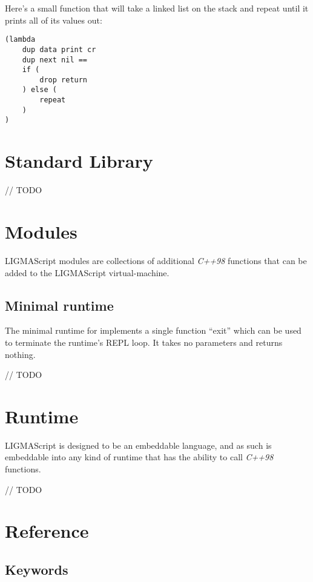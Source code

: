 \documentclass[12pt]{article}
\begin{document}
Here's a small function that will take a linked list on the stack and repeat until it prints all of its 
values out:
\begin{Verbatim}
(lambda
    dup data print cr
    dup next nil ==
    if (
        drop return
    ) else (
        repeat
    )
)
\end{Verbatim}

\section{Standard Library}

// TODO

\section{Modules}

LIGMAScript modules are collections of additional \emph{C++98} functions that can be added to the LIGMAScript virtual-machine.

\subsection {Minimal runtime}

The minimal runtime for implements a single function ``exit'' which can be used to terminate the runtime's REPL loop. It takes no parameters and returns nothing.

// TODO

\section{Runtime}

LIGMAScript is designed to be an embeddable language, and as such is embeddable into any kind of runtime that has the ability to call \emph{C++98} functions.

// TODO

\section{Reference}

\subsection {Keywords}
\end{document}

